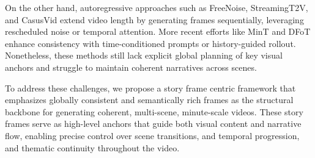 On the other hand, autoregressive approaches such as FreeNoise\cite{qiu2023freenoise}, StreamingT2V\cite{henschel2024streamingt2v}, and CasusVid\cite{causvid} extend video length by generating frames sequentially, leveraging rescheduled noise or temporal attention. More recent efforts like MinT\cite{wu2024mint} and DFoT\cite{song2025dfot} enhance consistency with time-conditioned prompts or history-guided rollout. Nonetheless, these methods still lack explicit global planning of key visual anchors and struggle to maintain coherent narratives across scenes.

To address these challenges, we propose a story frame centric framework that emphasizes globally consistent and semantically rich frames as the structural backbone for generating coherent, multi-scene, minute-scale videos.
These story frames serve as high-level anchors that guide both visual content and narrative flow, enabling precise control over scene transitions, and temporal progression, and thematic continuity throughout the video.













